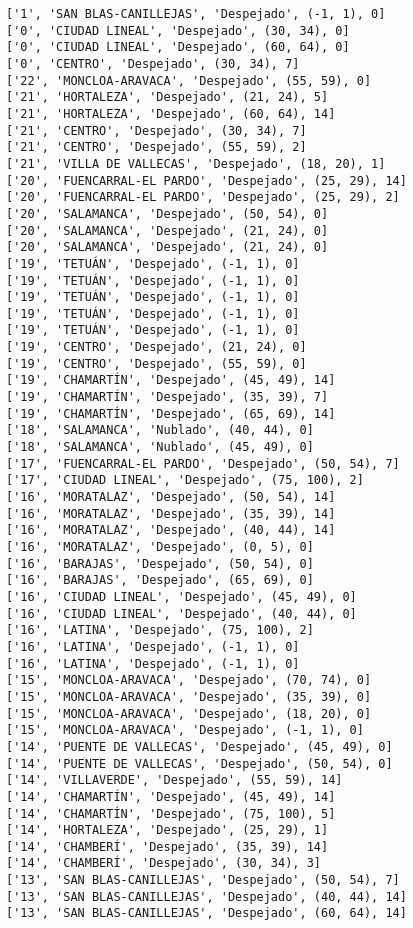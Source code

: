 \documentclass[11pt]{article}
\begin{document}
\begin{Verbatim}[commandchars=\\\{\}]
['1', 'SAN BLAS-CANILLEJAS', 'Despejado', (-1, 1), 0]
['0', 'CIUDAD LINEAL', 'Despejado', (30, 34), 0]
['0', 'CIUDAD LINEAL', 'Despejado', (60, 64), 0]
['0', 'CENTRO', 'Despejado', (30, 34), 7]
['22', 'MONCLOA-ARAVACA', 'Despejado', (55, 59), 0]
['21', 'HORTALEZA', 'Despejado', (21, 24), 5]
['21', 'HORTALEZA', 'Despejado', (60, 64), 14]
['21', 'CENTRO', 'Despejado', (30, 34), 7]
['21', 'CENTRO', 'Despejado', (55, 59), 2]
['21', 'VILLA DE VALLECAS', 'Despejado', (18, 20), 1]
['20', 'FUENCARRAL-EL PARDO', 'Despejado', (25, 29), 14]
['20', 'FUENCARRAL-EL PARDO', 'Despejado', (25, 29), 2]
['20', 'SALAMANCA', 'Despejado', (50, 54), 0]
['20', 'SALAMANCA', 'Despejado', (21, 24), 0]
['20', 'SALAMANCA', 'Despejado', (21, 24), 0]
['19', 'TETUÁN', 'Despejado', (-1, 1), 0]
['19', 'TETUÁN', 'Despejado', (-1, 1), 0]
['19', 'TETUÁN', 'Despejado', (-1, 1), 0]
['19', 'TETUÁN', 'Despejado', (-1, 1), 0]
['19', 'TETUÁN', 'Despejado', (-1, 1), 0]
['19', 'CENTRO', 'Despejado', (21, 24), 0]
['19', 'CENTRO', 'Despejado', (55, 59), 0]
['19', 'CHAMARTÍN', 'Despejado', (45, 49), 14]
['19', 'CHAMARTÍN', 'Despejado', (35, 39), 7]
['19', 'CHAMARTÍN', 'Despejado', (65, 69), 14]
['18', 'SALAMANCA', 'Nublado', (40, 44), 0]
['18', 'SALAMANCA', 'Nublado', (45, 49), 0]
['17', 'FUENCARRAL-EL PARDO', 'Despejado', (50, 54), 7]
['17', 'CIUDAD LINEAL', 'Despejado', (75, 100), 2]
['16', 'MORATALAZ', 'Despejado', (50, 54), 14]
['16', 'MORATALAZ', 'Despejado', (35, 39), 14]
['16', 'MORATALAZ', 'Despejado', (40, 44), 14]
['16', 'MORATALAZ', 'Despejado', (0, 5), 0]
['16', 'BARAJAS', 'Despejado', (50, 54), 0]
['16', 'BARAJAS', 'Despejado', (65, 69), 0]
['16', 'CIUDAD LINEAL', 'Despejado', (45, 49), 0]
['16', 'CIUDAD LINEAL', 'Despejado', (40, 44), 0]
['16', 'LATINA', 'Despejado', (75, 100), 2]
['16', 'LATINA', 'Despejado', (-1, 1), 0]
['16', 'LATINA', 'Despejado', (-1, 1), 0]
['15', 'MONCLOA-ARAVACA', 'Despejado', (70, 74), 0]
['15', 'MONCLOA-ARAVACA', 'Despejado', (35, 39), 0]
['15', 'MONCLOA-ARAVACA', 'Despejado', (18, 20), 0]
['15', 'MONCLOA-ARAVACA', 'Despejado', (-1, 1), 0]
['14', 'PUENTE DE VALLECAS', 'Despejado', (45, 49), 0]
['14', 'PUENTE DE VALLECAS', 'Despejado', (50, 54), 0]
['14', 'VILLAVERDE', 'Despejado', (55, 59), 14]
['14', 'CHAMARTÍN', 'Despejado', (45, 49), 14]
['14', 'CHAMARTÍN', 'Despejado', (75, 100), 5]
['14', 'HORTALEZA', 'Despejado', (25, 29), 1]
['14', 'CHAMBERÍ', 'Despejado', (35, 39), 14]
['14', 'CHAMBERÍ', 'Despejado', (30, 34), 3]
['13', 'SAN BLAS-CANILLEJAS', 'Despejado', (50, 54), 7]
['13', 'SAN BLAS-CANILLEJAS', 'Despejado', (40, 44), 14]
['13', 'SAN BLAS-CANILLEJAS', 'Despejado', (60, 64), 14]

\end{Verbatim}
\end{document}
